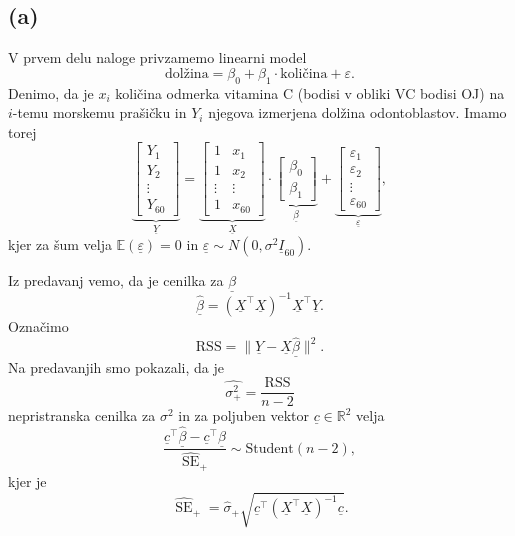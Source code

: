 \documentclass[10pt, a4paper]{article}
\newcommand{\R}{\mathbb {R}}
\newcommand{\E}{\mathbb {E}}
\DeclareMathOperator{\se}{SE}
\begin{document}
\subsection*{(a)}

V prvem delu naloge privzamemo linearni model 
$$\mathrm{dolžina} = \beta_0 + \beta_1 \cdot \mathrm{količina} + \varepsilon.$$
Denimo, da je $x_i$ količina odmerka vitamina C (bodisi v obliki VC bodisi OJ)
na $i$-temu morskemu prašičku in $Y_i$ njegova izmerjena dolžina odontoblastov.
Imamo torej 
$$\underbrace{\begin{bmatrix}
    Y_1\\
    Y_2\\
    \vdots\\
    Y_{60}
\end{bmatrix}}_{\underline{Y}} = \underbrace{\begin{bmatrix}
    1 & x_1\\
    1 & x_2\\
    \vdots & \vdots\\
    1 & x_{60}
\end{bmatrix}}_{\underline{X}} \cdot \underbrace{\begin{bmatrix}
    \beta_0\\
    \beta_1
\end{bmatrix}}_{\underline{\beta}} + \underbrace{\begin{bmatrix}
    \varepsilon_1\\
    \varepsilon_2\\
    \vdots\\
    \varepsilon_{60}
\end{bmatrix}}_{\underline{\varepsilon}},$$
kjer za šum velja $\E (\underline{\varepsilon}) = 0$ in $\underline{\varepsilon} \sim N(0, \sigma^2 \underline{I}_{60})$.

Iz predavanj vemo, da je cenilka za $\underline{\beta}$ 
$$\widehat{\underline{\beta}} = (\underline{X}^\top \underline{X})^{-1} \underline{X}^\top \underline{Y}.$$
Označimo 
$$\mathrm{RSS} = \|\underline{Y}  - \underline{X} \underline{\widehat{\beta}}\|^2.$$
Na predavanjih smo pokazali, da je 
$$\widehat{\sigma_+^2} = \frac{\mathrm{RSS}}{n - 2}$$
nepristranska cenilka za $\sigma^2$ in za poljuben vektor $\underline{c} \in \R^2$
velja 
$$\frac{\underline{c}^\top \widehat{\underline{\beta}} - \underline{c}^\top \underline{\beta}}{\widehat{\se}_+} \sim \mathrm{Student} (n - 2),$$
kjer je 
\begin{equation}
    \widehat{\se}_+ = \widehat{\sigma}_+ \sqrt{\underline{c}^\top (\underline{X}^\top \underline{X})^{-1} \underline{c}}. \label{eq:1}
\end{equation}
\end{document}
